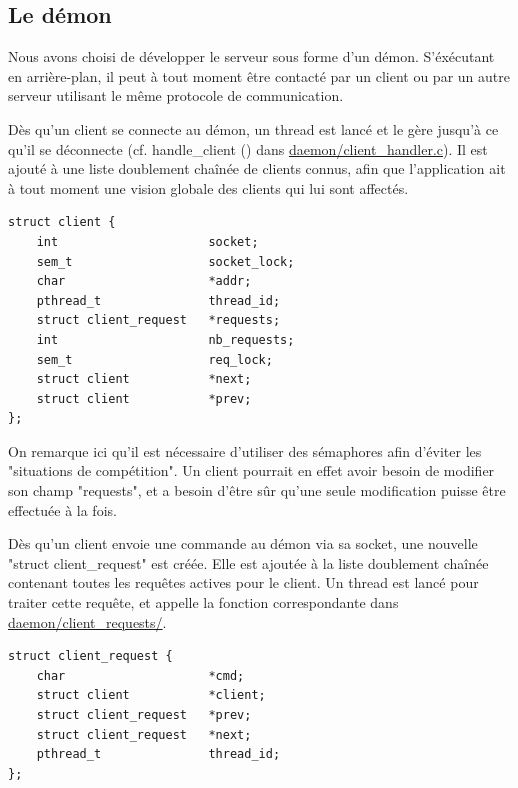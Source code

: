 	
\subsection{Le démon}

    Nous avons choisi de développer le serveur sous forme d'un démon.
S'éxécutant en arrière-plan, il peut à tout moment être contacté par un client
ou par un autre serveur utilisant le même protocole de communication.

    Dès qu'un client se connecte au démon, un thread est lancé et le gère
jusqu'à ce qu'il se déconnecte (cf. handle\_client () dans
\url{daemon/client_handler.c}). Il est ajouté à une liste doublement chaînée de
 clients connus, afin que l'application ait à tout moment une vision globale 
des clients qui lui sont affectés. 

\begin{lstlisting}
struct client {
    int                     socket;
    sem_t                   socket_lock;
    char                    *addr;
    pthread_t               thread_id;
    struct client_request   *requests;
    int                     nb_requests;
    sem_t                   req_lock;
    struct client           *next;
    struct client           *prev;
};
\end{lstlisting}

    On remarque ici qu'il est nécessaire d'utiliser des sémaphores afin d'éviter
les "situations de compétition". Un client pourrait en effet avoir besoin de
modifier son champ "requests", et a besoin d'être sûr qu'une seule modification
puisse être effectuée à la fois.

    Dès qu'un client envoie une commande au démon via sa socket, une nouvelle
"struct client\_request" est créée. Elle est ajoutée à la liste doublement
chaînée contenant toutes les requêtes actives pour le client. Un thread est
lancé pour traiter cette requête, et appelle la fonction correspondante dans
\url{daemon/client_requests/}.

\begin{lstlisting}
struct client_request {
    char                    *cmd;
    struct client           *client;
    struct client_request   *prev;
    struct client_request   *next;
    pthread_t               thread_id;
};
\end{lstlisting}


